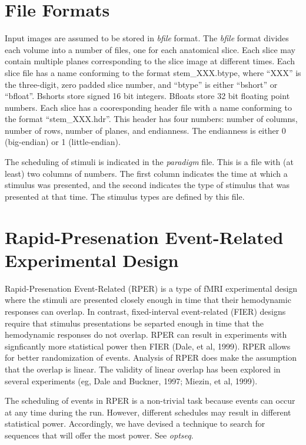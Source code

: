 \documentclass[10pt]{article}
\begin{document}
\section{File Formats}

Input images are assumed to be stored in {\em bfile} format.  The
{\em bfile} format divides each volume into a number of files, one for
each anatomical slice.  Each slice may contain multiple planes
corresponding to the slice image at different times.  Each slice file
has a name conforming to the format stem\_XXX.btype, where ``XXX'' is
the three-digit, zero padded slice number, and ``btype'' is either
``bshort'' or ``bfloat''.  Bshorts store signed 16 bit integers.
Bfloats store 32 bit floating point numbers.  Each slice has a
cooresponding header file with a name conforming to the format
``stem\_XXX.hdr''.  This header has four numbers: number of columns,
number of rows, number of planes, and endianness. The endianness is
either 0 (big-endian) or 1 (little-endian).

The scheduling of stimuli is indicated in the {\em paradigm} file.
This is a file with (at least) two columns of numbers.  The first
column indicates the time at which a stimulus was presented, and the
second indicates the type of stimulus that was presented at that
time. The stimulus types are defined by this file.

\section{Rapid-Presenation Event-Related Experimental Design}

Rapid-Presenation Event-Related (RPER) is a type of fMRI experimental
design where the stimuli are presented closely enough in time that
their hemodynamic responses can overlap.  In contrast, fixed-interval
event-related (FIER) designs require that stimulus presentations be
separted enough in time that the hemodynamic responses do not overlap.
RPER can result in experiments with signficantly more statistical
power then FIER (Dale, et al, 1999).  RPER allows for better
randomization of events.  Analysis of RPER does make the assumption
that the overlap is linear.  The validity of linear overlap has been
explored in several experiments (eg, Dale and Buckner, 1997; Miezin,
et al, 1999).

The scheduling of events in RPER is a non-trivial task because events
can occur at any time during the run.  However, different schedules
may result in different statistical power.  Accordingly, we have
devised a technique to search for sequences that will offer the most
power.  See {\em optseq}.
\end{document}
